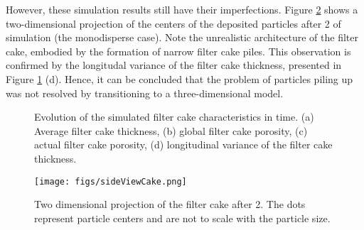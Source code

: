 However, these simulation results still have their imperfections. Figure \ref{fig:sideViewCake} shows a two-dimensional projection of the centers of the deposited particles after \unit{2}{\minute} of simulation (the monodisperse case). Note the unrealistic architecture of the filter cake, embodied by the formation of narrow filter cake piles. This observation is confirmed by the longitudal variance of the filter cake thickness, presented in Figure \ref{fig:monoVsMulti} (d). Hence, it can be concluded that the problem of particles piling up was not resolved by transitioning to a three-dimensional model.    

\begin{figure}[H]
\centerline{
    }
\centerline{
    }
    \caption{Evolution of the simulated filter cake characteristics in time. (a) Average filter cake thickness, (b) global filter cake porosity, (c) actual filter cake porosity, (d) longitudinal variance of the filter cake thickness.   \label{fig:monoVsMulti}}
\end{figure}

\begin{figure}[H]
\centering
\texttt{[image: figs/sideViewCake.png]}
\caption{Two dimensional projection of the filter cake after \unit{2}{\minute}. The dots represent particle centers and are not to scale with the particle size. \label{fig:sideViewCake}}
\end{figure}


